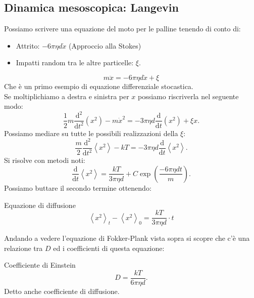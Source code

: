 \subsection{Dinamica mesoscopica: Langevin}%
Possiamo scrivere una equazione del moto per le palline tenendo di conto di:
\begin{itemize}
    \item Attrito: $-6\pi\eta d \dot{x}$ (Approccio alla Stokes) 
    \item Impatti random tra le altre particelle: $\xi$.
\end{itemize}
\begin{equation}
    m\ddot{x} = -6\pi\eta d \dot{x} + \xi
\end{equation}
Che è un primo esempio di equazione differenziale stocastica.\\
Se moltiplichiamo a destra e sinistra per $x$  possiamo riscriverla nel seguente modo:
\[
    \frac{1}{2}m\frac{\text{d} ^2}{\text{d} t^2}\left(x^2\right) - m\dot{x}^2 = -3\pi\eta d \frac{\text{d} }{\text{d} t}\left(x^2\right) + \xi x
.\] 
Possiamo mediare su tutte le possibili realizzazioni della $\xi$:
\[
    \frac{m}{2}\frac{\text{d} ^2}{\text{d} t^2} \left<x^2\right>-kT = -3\pi\eta d \frac{\text{d} }{\text{d} t} \left<x^2\right>
.\] 
Si risolve con metodi noti:
\[
    \frac{\text{d} }{\text{d} t} \left<x^2\right>=\frac{kT}{3\pi\eta d}+ C\exp\left(\frac{-6\pi\eta dt}{m}\right)
.\] 
Possiamo buttare il secondo termine ottenendo:
\begin{redbox}{Equazione di diffusione}
    \begin{equation}
       \left<x^2\right>_t-\left<x^2\right>_0 = \frac{kT}{3\pi\eta d}\cdot t
    \end{equation}
\end{redbox}
Andando a vedere l'equazione di Fokker-Plank vista sopra si scopre che c'è una relazione tra $D$  ed i coefficienti di questa equazione:
\begin{bluebox}{Coefficiente di Einstein}
    \[
        D = \frac{kT}{6\pi\eta d}
    .\] 
    Detto anche coefficiente di diffusione.
\end{bluebox}
